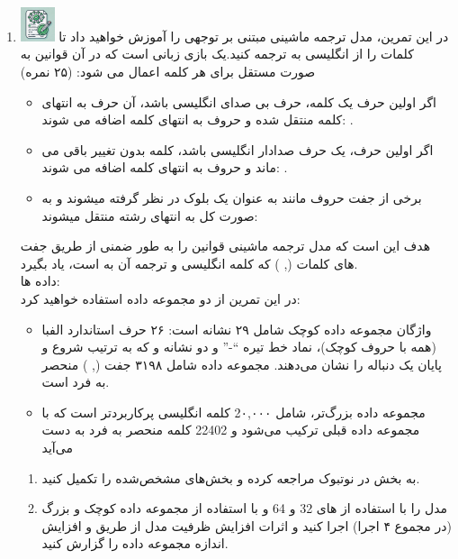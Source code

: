 \documentclass[12pt]{article}
\begin{document}
\begin{enumerate}
\begin{enumerate}
    \end{enumerate}
    \item \includegraphics[width=1cm]{figs/Allowed_with_contributino.jpg}
    در این تمرین، مدل ترجمه ماشینی مبتنی بر توجهی را آموزش خواهید داد تا کلمات را از انگلیسی به     ترجمه کنید.یک بازی زبانی است که در آن قوانین به صورت مستقل برای هر کلمه اعمال می    شود:    (۲۵ نمره)
    \begin{itemize}
        \item اگر اولین حرف یک کلمه، حرف بی صدای انگلیسی باشد، آن حرف به انتهای کلمه منتقل شده و حروف به انتهای کلمه اضافه می  شوند:  .
        \item  اگر اولین حرف، یک حرف صدادار انگلیسی باشد، کلمه بدون تغییر باقی می ماند و حروف  به انتهای کلمه اضافه می شوند: .
        \item برخی از جفت حروف مانند  به عنوان یک بلوک در نظر گرفته  میشوند و به صورت کل به انتهای رشته منتقل میشوند:
    \end{itemize}
    هدف این است که مدل ترجمه ماشینی قوانین را به طور ضمنی از طریق جفت های کلمات (, ) که   کلمه انگلیسی و  ترجمه آن به   است، یاد بگیرد.\\
    داده ها:\\
    در این تمرین از دو مجموعه داده استفاده خواهید کرد:\\
    \begin{itemize}
    \item واژگان مجموعه داده کوچک شامل ۲۹ نشانه است: ۲۶ حرف استاندارد الفبا (همه با حروف کوچک)، نماد خط تیره “-” و دو نشانه  و  که به ترتیب شروع و پایان یک دنباله را نشان می‌دهند. مجموعه داده شامل ۳۱۹۸ جفت (, ) منحصر به فرد است.
    \item مجموعه داده بزرگ‌تر، شامل 2۰,۰۰۰ کلمه انگلیسی پرکاربردتر است که با مجموعه داده قبلی ترکیب می‌شود و 22402 کلمه منحصر به فرد به دست می‌آید
    \end{itemize}
    \begin{enumerate}
    \item به بخش  در نوتبوک  مراجعه کرده و بخش‌های مشخص‌شده را تکمیل کنید.
    \item مدل  را با استفاده از   های 32 و 64 و با استفاده از مجموعه داده کوچک و بزرگ (در مجموع ۴ اجرا) اجرا کنید و اثرات افزایش ظرفیت مدل از طریق  و افزایش اندازه مجموعه داده را گزارش کنید.

\end{enumerate}
\end{enumerate}
\end{document}
